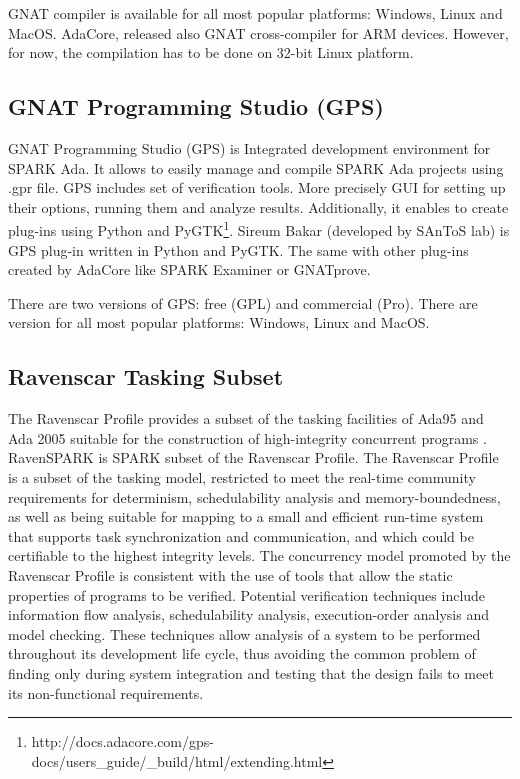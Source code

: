GNAT compiler is available for all most popular platforms: Windows, Linux and MacOS. AdaCore, released also GNAT cross-compiler for ARM devices. However, for now, the compilation has to be done on 32-bit Linux platform.


\subsection{GNAT Programming Studio (GPS)}
\label{background:spark:gps}

GNAT Programming Studio (GPS) is Integrated development environment for SPARK Ada. It allows to easily manage and compile SPARK Ada projects using .gpr file. GPS includes set of verification tools. More precisely GUI for setting up their options, running them and analyze results. Additionally, it enables to create plug-ins using Python and PyGTK\footnote{http://docs.adacore.com/gps-docs/users\_guide/\_build/html/extending.html}. Sireum Bakar (developed by SAnToS lab) is GPS plug-in written in Python and PyGTK. The same with other plug-ins created by AdaCore like SPARK Examiner or GNATprove.

There are two versions of GPS: free (GPL) and commercial (Pro). There are version for all most popular platforms: Windows, Linux and MacOS.


\subsection{Ravenscar Tasking Subset}
\label{background:spark:ravenscar}

The Ravenscar Profile provides a subset of the tasking facilities of Ada95 and Ada 2005 suitable for the construction of high-integrity concurrent programs \cite{Ravenscar:Online}. RavenSPARK is SPARK subset of the Ravenscar Profile. The Ravenscar Profile is a subset of the tasking model, restricted to meet the real-time community requirements for determinism, schedulability analysis and memory-boundedness, as well as being suitable for mapping to a small and efficient run-time system that supports task synchronization and communication, and which could be certifiable to the highest integrity levels. The concurrency model promoted by the Ravenscar Profile is consistent with the use of tools that allow the static properties of programs to be verified. Potential verification techniques include information flow analysis, schedulability analysis, execution-order analysis and model checking. These techniques allow analysis of a system to be performed throughout its development life cycle, thus avoiding the common problem of finding only during system integration and testing that the design fails to meet its non-functional requirements. \cite{Ravenscar:Article}


